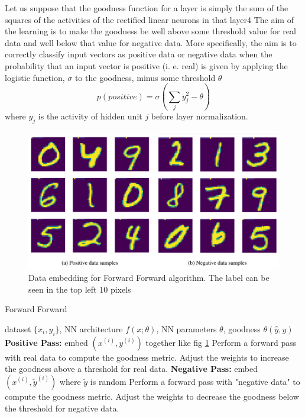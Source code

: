 \documentclass[nohyperref]{article}
\theoremstyle{plain}
\theoremstyle{definition}
\theoremstyle{remark}
\begin{document}
Let us suppose that the goodness function for a layer is simply the sum of the squares of the activities
of the rectified linear neurons in that layer4 The aim of the learning is to make the goodness be
well above some threshold value for real data and well below that value for negative data. More
specifically, the aim is to correctly classify input vectors as positive data or negative data when the probability that an input vector is positive (i. e. real) is given by applying the logistic function, $\sigma$ to the goodness, minus some threshold $\theta$
$$p(positive) = \sigma(\sum_{j}y^{2}_{j}-\theta)$$
where $y_{j}$ is the activity of hidden unit $j$ before layer normalization. 

\begin{figure}[ht]
\vskip 0.2in
\begin{center}
\centerline{\includegraphics[width=\columnwidth]{images/FF_embedding.png}}
\caption{Data embedding for Forward Forward algorithm. The label can be seen in the top left 10 pixels}
  \label{fig:FF_embed}
\end{center}
\vskip -0.2in
\end{figure}


\begin{algorithm}[tb]
   \caption{Forward Forward}
   \label{alg:FF}
\begin{algorithmic}
    dataset $\{x_{i},y_{i}\}$, NN architecture $f(x;\theta)$, NN parameters $\theta$, goodness $\theta(\hat{y},y)$ 
   \STATE \textbf{Positive Pass:}
   \STATE embed $(x^{(i)}, y^{(i)})$ together like fig \ref{fig:FF_embed}
    \STATE Perform a forward pass with real data to compute the goodness metric.
    \STATE Adjust the weights to increase the goodness above a threshold for real data.
    \STATE \textbf{Negative Pass:}
    \STATE embed $(x^{(i)}, \tilde{y}^{(i)})$  where $\tilde{y}$ is random
    \STATE Perform a forward pass with "negative data" to compute the goodness metric.
    \STATE Adjust the weights to decrease the goodness below the threshold for negative data.
\ENDFOR
\end{algorithmic}
\end{algorithm}
\end{document}
